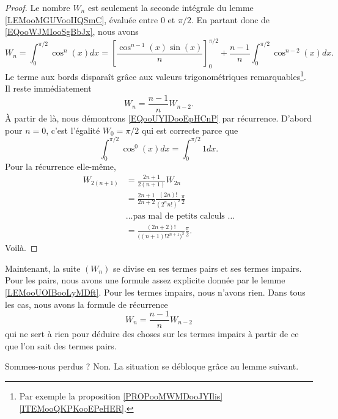\begin{proof}
	Le nombre \( W_n\) est seulement la seconde intégrale du lemme \ref{LEMooMGUVooIIQSmC}, évaluée entre \( 0\) et \( \pi/2\). En partant donc de \eqref{EQooWJMIooSgBbJx}, nous avons
	\begin{equation}
		W_n=\int_0^{\pi/2}\cos^n(x)dx=\left[ \frac{ \cos^{n-1}(x)\sin(x) }{ n } \right]_0^{\pi/2}+\frac{ n-1 }{ n }\int_0^{\pi/2}\cos^{n-2}(x)dx.
	\end{equation}
	Le terme aux bords disparaît grâce aux valeurs trigonométriques remarquables\footnote{Par exemple la proposition \ref{PROPooMWMDooJYIlis}\ref{ITEMooQKPKooEPeHER}.}. Il reste immédiatement
	\begin{equation}
		W_n=\frac{ n-1 }{ n }W_{n-2}.
	\end{equation}
	À partir de là, nous démontrons \eqref{EQooUYIDooEpHCnP} par récurrence. D'abord pour \( n=0\), c'est l'égalité \( W_0=\pi/2\) qui est correcte parce que
	\begin{equation}
		\int_0^{\pi/2}\cos^0(x)dx=\int_0^{\pi/2}1dx.
	\end{equation}
	Pour la récurrence elle-même,
	\begin{subequations}
		\begin{align}
			W_{2(n+1)} & =\frac{ 2n+1 }{ 2(n+1) }W_{2n}                                     \\
			           & =\frac{ 2n+1 }{ 2n+2 }\frac{ (2n)! }{ (2^nn!)^2 }\frac{ \pi }{ 2 } \\
			           & \text{\ldots pas mal de petits calculs \ldots}                     \\
			           & =\frac{ (2n+2)! }{ \big( (n+1)!2^{n+1} \big)^2 }\frac{ \pi }{2}.
		\end{align}
	\end{subequations}
	Voilà.
\end{proof}

Maintenant, la suite \( (W_n)\) se divise en ses termes pairs et ses termes impairs. Pour les pairs, nous avons une formule assez explicite donnée par le lemme \ref{LEMooUOIBooLyMDft}. Pour les termes impairs, nous n'avons rien. Dans tous les cas, nous avons la formule de récurrence
\begin{equation}
	W_n=\frac{ n-1 }{ n }W_{n-2}
\end{equation}
qui ne sert à rien pour déduire des choses sur les termes impairs à partir de ce que l'on sait des termes pairs.

Sommes-nous perdus ? Non. La situation se débloque grâce au lemme suivant.

